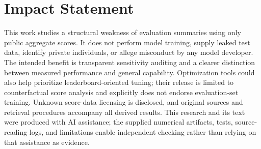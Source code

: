 \documentclass{article}
\begin{document}
\clearpage
\section*{Impact Statement}
This work studies a structural weakness of evaluation summaries using only public aggregate scores. It does not perform model training, supply leaked test data, identify private individuals, or allege misconduct by any model developer. The intended benefit is transparent sensitivity auditing and a clearer distinction between measured performance and general capability. Optimization tools could also help prioritize leaderboard-oriented tuning; their release is limited to counterfactual score analysis and explicitly does not endorse evaluation-set training. Unknown score-data licensing is disclosed, and original sources and retrieval procedures accompany all derived results. This research and its text were produced with AI assistance; the supplied numerical artifacts, tests, source-reading logs, and limitations enable independent checking rather than relying on that assistance as evidence.



\clearpage

\end{document}
